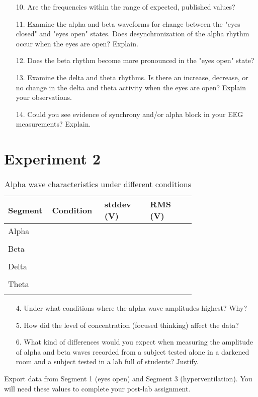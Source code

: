 \documentclass{article}
\begin{document}
\begin{itemize}
	\item[10.] Are the frequencies within the range of expected, published values?\vspace{1cm}
	\item[11.] Examine the alpha and beta waveforms for change between the "eyes closed" and "eyes open" states. Does desynchronization of the alpha rhythm occur when the eyes are open? Explain.\vspace{3cm}
	\item[12.] Does the beta rhythm become more pronounced in the "eyes open" state?\vspace{1cm}
	\item[13.] Examine the delta and theta rhythms. Is there an increase, decrease, or no change in the delta and theta activity when the eyes are open? Explain your observations.\vspace{4cm}
	\item[14.] Could you see evidence of synchrony and/or alpha block in your EEG measurements? Explain.
\end{itemize}
\pagebreak

\section*{Experiment 2}
\begin{table}[h]
	\centering
	\caption{Alpha wave characteristics under different conditions}
	\begin{tabular}[h!]{p{0.08\linewidth}|p{0.22\linewidth}p{0.22\linewidth}p{0.22\linewidth}}
	\toprule
	Segment  & Condition & stddev (\textmu V) & RMS (\textmu V)\\
	\midrule
	Alpha & & &\\& & &\\
	\midrule
	Beta & & &\\& & &\\
	\midrule
	Delta & & &\\& & &\\
	\midrule
	Theta & & &\\& & &\\
	\bottomrule
	\end{tabular}
	\end{table}

\begin{itemize}
	\item[4.] Under what conditions where the alpha wave amplitudes highest? Why?\vspace{3.5cm}
	\item[5.] How did the level of concentration (focused thinking) affect the data?\vspace{3.5cm}
	\item[6.] What kind of differences would you expect when measuring the amplitude of alpha and beta waves recorded from a subject tested alone in a darkened room and a subject tested in a lab full of students? Justify.\vspace{4cm}
\end{itemize}

\begin{info}
	Export data from Segment 1 (eyes open) and Segment 3 (hyperventilation). You will need these values to complete your post-lab assignment.
\end{info}
\end{document}
